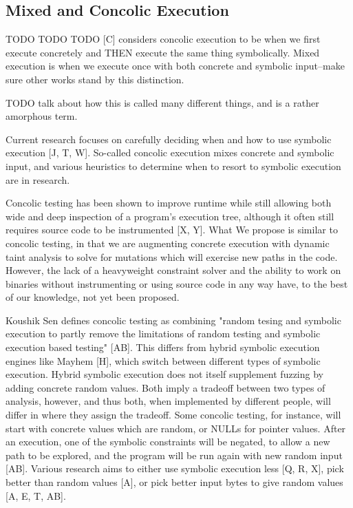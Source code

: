 \documentclass[11pt,expanded,copyright]{fsuthesis}
\begin{document}
\subsection{Mixed and Concolic Execution}

TODO TODO TODO [C] considers concolic execution to be when we first execute concretely and THEN execute the same thing symbolically. Mixed execution is when we execute once with both concrete and symbolic input--make sure other works stand by this distinction.

TODO talk about how this is called many different things, and is a rather amorphous term.

Current research focuses on carefully deciding when and how to use symbolic execution [J, T, W]. So-called concolic execution mixes concrete and symbolic input, and various heuristics to determine when to resort to symbolic execution are in research.

Concolic testing has been shown to improve runtime while still allowing both wide and deep inspection of a program's execution tree, although it often still requires source code to be instrumented [X, Y]. What We propose is similar to concolic testing, in that we are augmenting concrete execution with dynamic taint analysis to solve for mutations which will exercise new paths in the code. However, the lack of a heavyweight constraint solver and the ability to work on binaries without instrumenting or using source code in any way have, to the best of our knowledge, not yet been proposed.

Koushik Sen defines concolic testing as combining "random tesing and symbolic execution to partly remove the limitations of random testing and symbolic execution based testing" [AB]. This differs from hybrid symbolic execution engines like Mayhem [H], which switch between different types of symbolic execution. Hybrid symbolic execution does not itself supplement fuzzing by adding concrete random values. Both imply a tradeoff between two types of analysis, however, and thus both, when implemented by different people, will differ in where they assign the tradeoff. Some concolic testing, for instance, will start with concrete values which are random, or NULLs for pointer values. After an execution, one of the symbolic constraints will be negated, to allow a new path to be explored, and the program will be run again with new random input [AB]. Various research aims to either use symbolic execution less [Q, R, X], pick better than random values [A], or pick better input bytes to give random values [A, E, T, AB].
\end{document}
